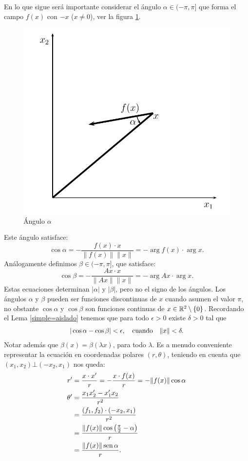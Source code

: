 En lo que sigue será importante considerar el ángulo $\alpha\in
(-\pi,\pi]$ que forma el campo $f(x)$ con $-x$ ($x\neq 0$), ver la
figura \ref{anguloa}.
\begin{figure}[h]

\begin{center}
\includegraphics[scale=.2]{imagenes/angulo.png}
\end{center}
\caption{Ángulo $\alpha$}\label{anguloa}
\end{figure}
Este ángulo satisface:
\[
    \cos \alpha=-\frac{f(x)\cdot x}{\|f(x)\|\|x\|}=-\arg f(x)\cdot \arg x.
\]
Análogamente definimos $\beta \in(-\pi,\pi]$, que satisface:
\[
    \cos \beta=-\frac{Ax\cdot x}{\|Ax\|\|x\|}=-\arg Ax\cdot \arg x.
\]
Estas ecuaciones determinan $|\alpha|$ y $|\beta|$, pero no el
signo de los ángulos. Los ángulos $\alpha$ y $\beta$ pueden ser
funciones discontinuas de $x$ cuando asumen el valor $\pi$, no
obstante $\cos\alpha$ y $\cos\beta$ son funciones continuas de
$x\in\rr^2\setminus\{0\}$. Recordando el Lema \ref{simple=aislado}
tenemos que para todo $\epsilon>0$ existe $\delta>0$ tal que
\begin{equation}\label{coscerca}
    |\cos\alpha-\cos\beta|<\epsilon,\quad\hbox{cuando}\quad\|x\|<\delta.
\end{equation}
Notar además que $\beta(x)=\beta(\lambda x)$, para todo $\lambda$.
Es a menudo conveniente representar la ecuación en coordenadas
polares $(r,\theta)$, teniendo en cuenta que
$(x_1,x_2)\bot(-x_2,x_1)$ nos queda:
\begin{equation}\label{ecuaenpola}
    \begin{split}
    r'&=\frac{x\cdot x'}{r}=-\frac{x\cdot
    f(x)}{r}=-\|f(x)\|\cos\alpha\\
    \theta'&=\frac{x_1x_2'-x_1'x_2}{r^2}\\
    &=\frac{(f_1,f_2)\cdot
    (-x_2,x_1)}{r^2}\\
    &=\frac{\|f(x)\|\cos\big(\frac{\pi}{2}-\alpha\big)}{r}\\
    &=\frac{\|f(x)\|\sen\alpha}{r}.
    \end{split}
\end{equation}




